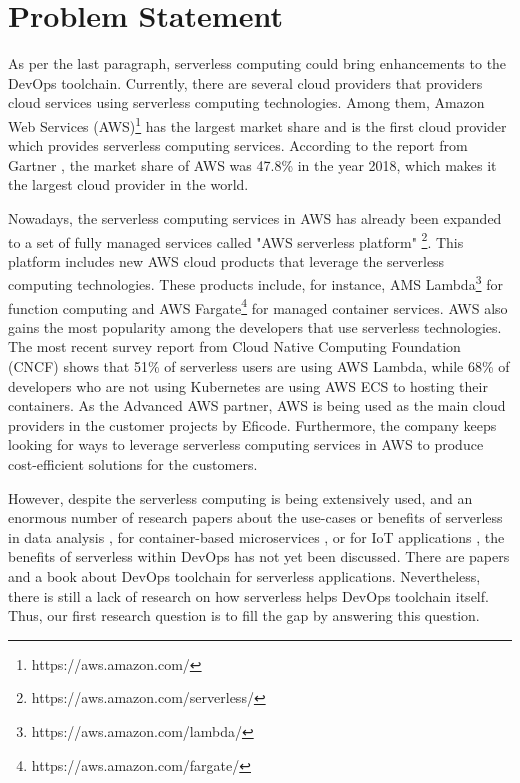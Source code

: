 \section{Problem Statement}
As per the last paragraph, serverless computing could bring enhancements to the DevOps toolchain. Currently, there are several cloud providers that providers cloud services using serverless computing technologies.
Among them, Amazon Web Services (AWS)\footnote{https://aws.amazon.com/} has the largest market share and is the first cloud provider which provides serverless computing services. According to the report from Gartner \cite{GartnerS47:online}, the market share of AWS was 47.8\% in the year 2018, which makes it the largest cloud provider in the world.
\par
Nowadays, the serverless computing services in AWS has already been expanded to a set of fully managed services called "AWS serverless platform" \footnote{https://aws.amazon.com/serverless/}. This platform includes new AWS cloud products that leverage the serverless computing technologies. These products include, for instance, AMS Lambda\footnote{https://aws.amazon.com/lambda/} for function computing and AWS Fargate\footnote{https://aws.amazon.com/fargate/} for managed container services.
AWS also gains the most popularity among the developers that use serverless technologies. The most recent survey report \cite{cncf2020} from Cloud Native Computing Foundation (CNCF) shows that 51\% of serverless users are using AWS Lambda, while 68\% of developers who are not using Kubernetes are using AWS ECS to hosting their containers.
As the Advanced AWS partner, AWS is being used as the main cloud providers in the customer projects by Eficode. Furthermore, the company keeps looking for ways to leverage serverless computing services in AWS to produce cost-efficient solutions for the customers.
\par
However, despite the serverless computing is being extensively used, and an enormous number of research papers about the use-cases or benefits of serverless in data analysis \cite{8457831}, for container-based microservices \cite{perez2018serverless}, or for IoT applications \cite{nastic2017serverless} \cite{glikson2017deviceless}, the benefits of serverless within DevOps has not yet been discussed. There are papers \cite{ivanov2018implementation} and a book \cite{bangera2018devops} about DevOps toolchain for serverless applications. Nevertheless, there is still a lack of research on how serverless helps DevOps toolchain itself. Thus, our first research question is to fill the gap by answering this question. 
